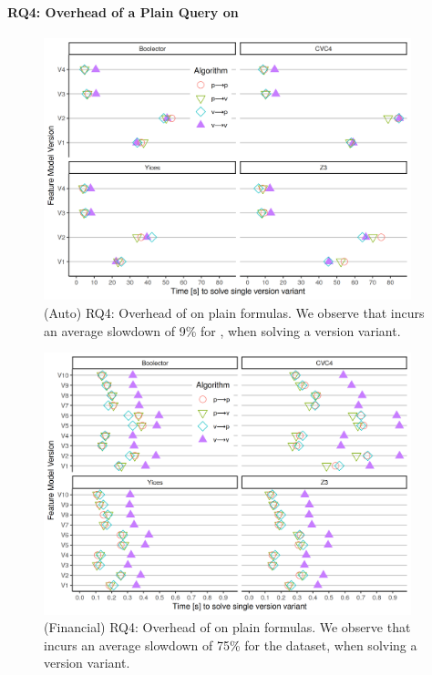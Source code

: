 \paragraph{RQ4: Overhead of a Plain Query on \vsat{}}
%
\begin{figure}
  \includegraphics[width=0.95\textwidth]{Plots/RQ4_Auto}
  \caption{(Auto) RQ4: Overhead of \vTov{} on plain formulas. We observe that
    \vTov{} incurs an average slowdown of 9\% for \auto{}, when
    solving a version variant.}%
  \label{res:overhead:auto}
\end{figure}
%
\begin{figure}
  \includegraphics[width=0.95\textwidth]{Plots/RQ4_Fin}
  \caption{(Financial) RQ4: Overhead of \vTov{} on plain formulas. We observe
    that \vTov{} incurs an average slowdown of 75\% for the \fin{}
    dataset, when solving a version variant.}%
  \label{res:overhead:fin}
\end{figure}
